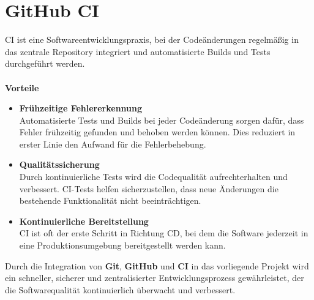 \section{GitHub CI}
\label{sec:tooling-ci}
\ac{CI} ist eine Softwareentwicklungspraxis, bei der Codeänderungen regelmäßig in das zentrale Repository integriert und automatisierte Builds und Tests durchgeführt werden.\\\\
\textbf{Vorteile}
\begin{itemize}
    \item \textbf{Frühzeitige Fehlererkennung}\\
    Automatisierte Tests und Builds bei jeder Codeänderung sorgen dafür, dass Fehler frühzeitig gefunden und behoben werden können.
    Dies reduziert in erster Linie den Aufwand für die Fehlerbehebung.
    \item \textbf{Qualitätssicherung}\\
    Durch kontinuierliche Tests wird die Codequalität aufrechterhalten und verbessert.
    CI-Tests helfen sicherzustellen, dass neue Änderungen die bestehende Funktionalität nicht beeinträchtigen.
    \item \textbf{Kontinuierliche Bereitstellung}\\
    CI ist oft der erste Schritt in Richtung \ac{CD}, bei dem die Software jederzeit in eine Produktionsumgebung bereitgestellt werden kann.
\end{itemize}
Durch die Integration von \textbf{Git}, \textbf{GitHub} und \textbf{CI} in das vorliegende Projekt wird ein schneller, sicherer und zentralisierter Entwicklungsprozess gewährleistet, der die Softwarequalität kontinuierlich überwacht und verbessert.